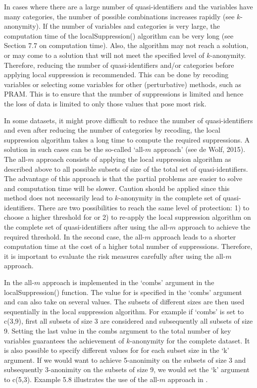 \documentclass[letterpaper,10pt,english]{sphinxmanual}
\begin{document}
In cases where there are a large number of quasi-identifiers and the
variables have many categories, the number of possible combinations
increases rapidly (see \(k\)-anonymity). If the number of variables
and categories is very large, the computation time of the
localSuppression() algorithm can be very long (see Section 7.7 on
computation time). Also, the algorithm may not reach a solution, or may
come to a solution that will not meet the specified level of
\(k\)-anonymity. Therefore, reducing the number of quasi-identifiers
and/or categories before applying local suppression is recommended. This
can be done by recoding variables or selecting some variables for other
(perturbative) methods, such as PRAM. This is to ensure that the number
of suppressions is limited and hence the loss of data is limited to only
those values that pose most risk.

In some datasets, it might prove difficult to reduce the number of
quasi-identifiers and even after reducing the number of categories by
recoding, the local suppression algorithm takes a long time to compute
the required suppressions. A solution in such cases can be the so-called
‘all-\(m\) approach’ (see de Wolf, 2015). The all-\(m\)
approach consists of applying the local suppression algorithm as
described above to all possible subsets of size  of the total set of
quasi-identifiers. The advantage of this approach is that the partial
problems are easier to solve and computation time will be slower.
Caution should be applied since this method does not necessarily lead to
\(k\)-anonymity in the complete set of quasi-identifiers. There are
two possibilities to reach the same level of protection: 1) to choose a
higher threshold for  or 2) to re-apply the local suppression
algorithm on the complete set of quasi-identifiers after using the
all-\(m\) approach to achieve the required threshold. In the
second case, the all-\(m\) approach leads to a shorter computation
time at the cost of a higher total number of suppressions.  Therefore, it is
important to evaluate the risk measures carefully after using the
all-\(m\) approach.

In  the all-\(m\) approach is implemented in the ‘combs’
argument in the localSuppression() function. The value for  is
specified in the ‘combs’ argument and can also take on several values.
The subsets of different sizes are then used sequentially in the local
suppression algorithm. For example if ‘combs’ is set to c(3,9), first
all subsets of size 3 are considered and subsequently all subsets of
size 9. Setting the last value in the combs argument to the total number
of key variables guarantees the achievement of \(k\)-anonymity for
the complete dataset. It is also possible to specify different values
for  for each subset size in the ‘k’ argument. If we would want to
achieve 5-anonimity on the subsets of size 3 and subsequently
3-anonimity on the subsets of size 9, we would set the ‘k’ argument to
c(5,3). Example 5.8 illustrates the use of the all-\(m\) approach
in .
\end{document}

